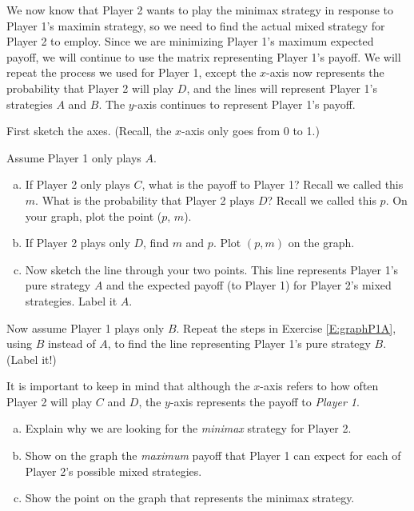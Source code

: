 We now know that Player 2 wants to play the minimax strategy in response to Player 1's maximin strategy, so we need to find the actual mixed strategy for Player 2 to employ. Since we are minimizing Player 1's maximum expected payoff, we will continue to use the matrix representing Player 1's payoff. We will repeat the process we used for Player 1, except the $x$-axis now represents the probability that Player 2 will play $D$, and the lines will represent Player 1's strategies $A$ and $B$. The $y$-axis continues to represent Player 1's payoff. 

\begin{xca}\label{E:graphStep0}
First sketch the axes. (Recall, the $x$-axis only goes from 0 to 1.)
\end{xca}

\begin{xca}\label{E:graphP1A}
Assume Player 1 only plays $A$. 
\begin{enumerate}[(a)]
\item If Player 2 only plays $C$, what is the payoff to Player 1? Recall we called this $m$. What is the probability that Player 2 plays $D$? Recall we called this $p$. On your graph, plot the point ($p$, $m$).

\item If Player 2 plays only $D$, find $m$ and $p$. Plot $(p, m)$ on the graph.

\item Now sketch the line through your two points. This line represents Player 1's pure strategy $A$ and the expected payoff (to Player 1) for Player 2's mixed strategies. Label it $A$.
\end{enumerate}
\end{xca}

\begin{xca}\label{E:graphP1B}
Now assume Player 1 plays only $B$. Repeat the steps in Exercise \ref{E:graphP1A}, using $B$ instead of $A$, to find the line representing Player 1's pure strategy $B$. (Label it!)
\end{xca}

\begin{xca}\label{E:graphminimax} It is important to keep in  mind that although the $x$-axis refers to how often Player 2 will play $C$ and $D$, the $y$-axis represents the payoff to \emph{Player 1}. 
\begin{enumerate}[(a)]
\item Explain why we are looking for the \emph{minimax} strategy for Player 2. 
\item Show on the graph the \emph{maximum} payoff that Player 1 can expect for each of Player 2's possible mixed strategies.
\item Show the point on the graph that represents the minimax strategy.
\end{enumerate}
\end{xca}

